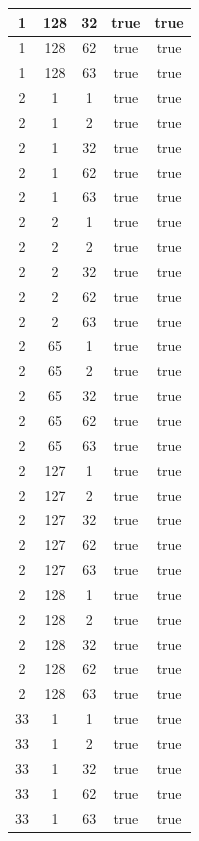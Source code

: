 \documentclass[a4paper,9pt,oneside]{scrreprt}
\begin{document}
\begin{enumerate}[a)]
\begin{paracol}{2}
\begin{table}[!htb]
\begin{minipage}{.5\linewidth}
{\begin{tabular}{|c|c|c|c|c|}
							1&128&32&true&true\\
							\hline
							1&128&62&true&true\\
							\hline
							1&128&63&true&true\\
							\hline
							2&1&1&true&true\\
							\hline
							2&1&2&true&true\\
							\hline
							2&1&32&true&true\\
							\hline
							2&1&62&true&true\\
							\hline
							2&1&63&true&true\\
							\hline
							2&2&1&true&true\\
							\hline
							2&2&2&true&true\\
							\hline
							2&2&32&true&true\\
							\hline
							2&2&62&true&true\\
							\hline
							2&2&63&true&true\\
							\hline
							2&65&1&true&true\\
							\hline
							2&65&2&true&true\\
							\hline
							2&65&32&true&true\\
							\hline
							2&65&62&true&true\\
							\hline
							2&65&63&true&true\\
							\hline
							2&127&1&true&true\\
							\hline
							2&127&2&true&true\\
							\hline
							2&127&32&true&true\\
							\hline
							2&127&62&true&true\\
							\hline
							2&127&63&true&true\\
							\hline
							2&128&1&true&true\\
							\hline
							2&128&2&true&true\\
							\hline
							2&128&32&true&true\\
							\hline
							2&128&62&true&true\\
							\hline
							2&128&63&true&true\\
							\hline
							33&1&1&true&true\\
							\hline
							33&1&2&true&true\\
							\hline
							33&1&32&true&true\\
							\hline
							33&1&62&true&true\\
							\hline
							33&1&63&true&true\\

\end{tabular}}
\end{minipage}
\end{table}
\end{paracol}
\end{enumerate}
\end{document}
